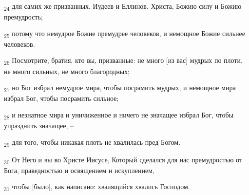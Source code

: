 \begin{tcolorbox}
\textsubscript{24} для самих же призванных, Иудеев и Еллинов, Христа, Божию силу и Божию премудрость;
\end{tcolorbox}
\begin{tcolorbox}
\textsubscript{25} потому что немудрое Божие премудрее человеков, и немощное Божие сильнее человеков.
\end{tcolorbox}
\begin{tcolorbox}
\textsubscript{26} Посмотрите, братия, кто вы, призванные: не много [из вас] мудрых по плоти, не много сильных, не много благородных;
\end{tcolorbox}
\begin{tcolorbox}
\textsubscript{27} но Бог избрал немудрое мира, чтобы посрамить мудрых, и немощное мира избрал Бог, чтобы посрамить сильное;
\end{tcolorbox}
\begin{tcolorbox}
\textsubscript{28} и незнатное мира и уничиженное и ничего не значащее избрал Бог, чтобы упразднить значащее, --
\end{tcolorbox}
\begin{tcolorbox}
\textsubscript{29} для того, чтобы никакая плоть не хвалилась пред Богом.
\end{tcolorbox}
\begin{tcolorbox}
\textsubscript{30} От Него и вы во Христе Иисусе, Который сделался для нас премудростью от Бога, праведностью и освящением и искуплением,
\end{tcolorbox}
\begin{tcolorbox}
\textsubscript{31} чтобы [было], как написано: хвалящийся хвались Господом.
\end{tcolorbox}
